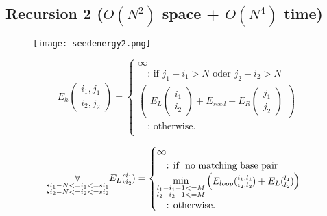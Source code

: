 \subsection{Recursion 2 ($O(N^{2})$ space + $O(N^{4})$ time)}

\begin{figure}[H]
	\centering
	\texttt{[image: seedenergy2.png]}
\end{figure}

\begin{equation*}
E_h(\substack{i_1,j_1\\i_2,j_2}) = \begin{cases}
\infty\\
\quad\text{: if } j_{1} - i_{1} > N \text{ oder } j_{2} - i_{2} > N\\
\begin{pmatrix}
E_{L}(\substack{i_1\\i_2}) + E_{seed} + E_{R}(\substack{j_1\\j_2})
\end{pmatrix}\\
\quad\text{: otherwise.}\\
\end{cases}
\end{equation*}

\begin{equation*}
\underset{\substack{si_{1}-N <= i_{1} <= si_{1}\\si_{2}-N <= i_{2} <= si_{2}}}{\forall}\\
E_L(\substack{i_1\\i_2}) = \begin{cases}
\infty\\
\quad\text{: if } \text{ no matching base pair }\\
\min\limits_{\substack{l_{1} - i_{1} - 1 <= M\\l_{2} - i_{2} - 1 <= M}}
\begin{pmatrix}
E_{loop}(\substack{i_1,l_1\\i_2,l_2}) + E_L(\substack{l_1\\l_2})
\end{pmatrix}\\
\quad\text{: otherwise.}\\

\end{cases}
\end{equation*}

